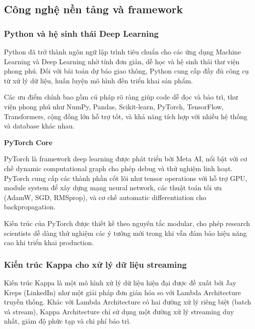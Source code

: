 \newpage
\subsection{Công nghệ nền tảng và framework}

\subsubsection{Python và hệ sinh thái Deep Learning}


Python đã trở thành ngôn ngữ lập trình tiêu chuẩn cho các ứng dụng Machine Learning và Deep Learning nhờ tính đơn giản, dễ học và hệ sinh thái thư viện phong phú. Đối với bài toán dự báo giao thông, Python cung cấp đầy đủ công cụ từ xử lý dữ liệu, huấn luyện mô hình đến triển khai sản phẩm.

Các ưu điểm chính bao gồm cú pháp rõ ràng giúp code dễ đọc và bảo trì, thư viện phong phú như NumPy, Pandas, Scikit-learn, PyTorch, TensorFlow, Transformers, cộng đồng lớn hỗ trợ tốt, và khả năng tích hợp với nhiều hệ thống và database khác nhau.


\textbf{PyTorch Core}

PyTorch là framework deep learning được phát triển bởi Meta AI, nổi bật với cơ chế dynamic computational graph cho phép debug và thử nghiệm linh hoạt. PyTorch cung cấp các thành phần cốt lõi như tensor operations với hỗ trợ GPU, module system để xây dựng mạng neural network, các thuật toán tối ưu (AdamW, SGD, RMSprop), và cơ chế automatic differentiation cho backpropagation.

Kiến trúc của PyTorch được thiết kế theo nguyên tắc modular, cho phép research scientists dễ dàng thử nghiệm các ý tưởng mới trong khi vẫn đảm bảo hiệu năng cao khi triển khai production.

\subsubsection{Kiến trúc Kappa cho xử lý dữ liệu streaming}


Kiến trúc Kappa là một mô hình xử lý dữ liệu hiện đại được đề xuất bởi Jay Kreps (LinkedIn) như một giải pháp đơn giản hóa so với Lambda Architecture truyền thống. Khác với Lambda Architecture có hai đường xử lý riêng biệt (batch và stream), Kappa Architecture chỉ sử dụng một đường xử lý streaming duy nhất, giảm độ phức tạp và chi phí bảo trì.

